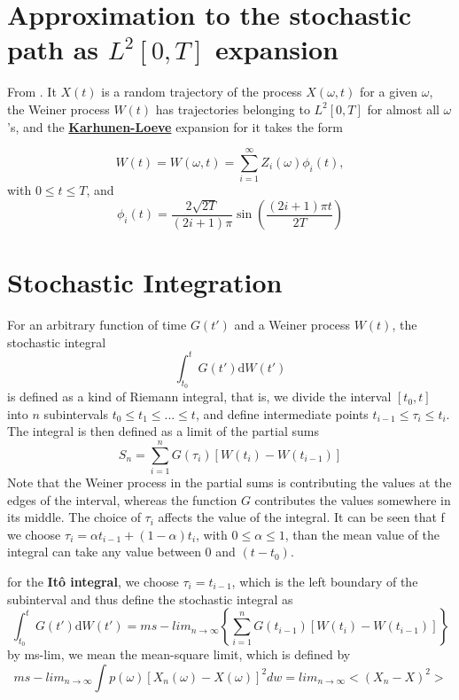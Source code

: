 \documentclass[12pt]{book}
\begin{document}
\section{Approximation to the stochastic path as $L^2[0,T]$ expansion}
From \cite{iacus2009simulation}. It $X(t)$ is a random trajectory of the process $X(\omega, t)$ for a given $\omega$, the Weiner process $W(t)$ has trajectories belonging to $L^2[0,T]$ for almost all $\omega$'s, and the \textbf{\href{http://en.wikipedia.org/wiki/Karhunen-Loeve_theorem}{Karhunen-Loeve}} expansion for it takes the form 

\begin{equation*}
W(t)=W(\omega,t)= \sum_{i=1}^\infty Z_i(\omega)\phi_i(t), 
\end{equation*}
with $0\leq t \leq T$, and 
\begin{equation*}
\phi_i(t) = \frac{2\sqrt{2T}}{(2i+1)\pi} \sin \left(\frac{(2i+1)\pi t}{2T} \right)
\end{equation*}

\section{Stochastic Integration}\label{section_stochasticIntegration}
For an arbitrary function of time $G(t')$ and a Weiner process $W(t)$, the stochastic integral 
\begin{equation*}
\int_{t_0}^t G(t')\mathrm{d}W(t')
\end{equation*}
is defined as a kind of Riemann integral, that is, we divide the interval $[t_0,t]$ into $n$ subintervals $t_0\leq t_1\leq ...\leq t$, and define intermediate points $t_{i-1}\leq\tau_i\leq t_{i}$. The integral is then defined as a limit of the partial sums 
\begin{equation*}
S_n=\sum_{i=1}^nG(\tau_i)[W(t_i)-W(t_{i-1})]
\end{equation*}
Note that the Weiner process in the partial sums is contributing the values at the edges of the interval, whereas the function $G$ contributes the values somewhere in its middle.
The choice of $\tau_i$ affects the value of the integral. It can be seen that f we choose $\tau_i=\alpha t_{i-1}+(1-\alpha)t_i$, with $0\leq \alpha\leq 1$,  than the mean value of the integral can take any value between 0 and $(t-t_0)$. 

for the \textbf{It\^{o} integral}, we choose $\tau_i=t_{i-1}$, which is the left boundary of the subinterval and thus define the stochastic integral as
\begin{equation*}
\int_{t_0}^{t}G(t')\mathrm{d}W(t')=ms-lim_{n\rightarrow\infty}\left\{\sum_{i=1}^nG(t_{i-1})[W(t_{i})-W(t_{i-1})] \right\}
\end{equation*}
by ms-lim, we mean the mean-square limit, which is defined by 
\begin{equation*}
ms-lim_{n\rightarrow\infty}\int p(\omega)[X_n(\omega)-X(\omega)]^2dw= lim_{n\rightarrow \infty}<(X_n-X)^2>
\end{equation*}
\end{document}
